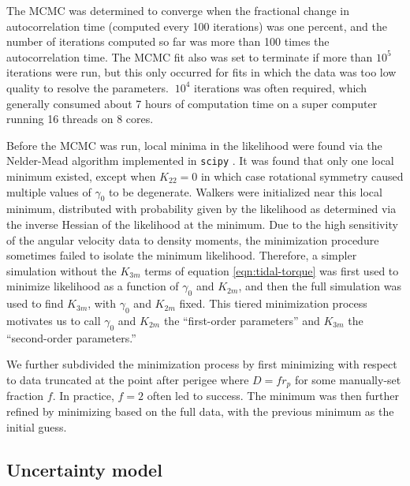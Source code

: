 \documentclass[fleqn,usenatbib]{mnras}
\begin{document}
The MCMC was determined to converge when the fractional change in autocorrelation time (computed every 100 iterations) was one percent, and the number of iterations computed so far was more than 100 times the autocorrelation time. The MCMC fit also was set to terminate if more than $10^5$ iterations were run, but this only occurred for fits in which the data was too low quality to resolve the parameters. $~10^4$ iterations was often required, which generally consumed about 7 hours of computation time on a super computer running 16 threads on 8 cores.

Before the MCMC was run, local minima in the likelihood were found via the Nelder-Mead algorithm implemented in \texttt{scipy} \cite{Gao2012}. It was found that only one local minimum existed, except when $K_{22}=0$ in which case rotational symmetry caused multiple values of $\gamma_0$ to be degenerate. Walkers were initialized near this local minimum, distributed with probability given by the likelihood as determined via the inverse Hessian of the likelihood at the minimum. Due to the high sensitivity of the angular velocity data to density moments, the minimization procedure sometimes failed to isolate the minimum likelihood. Therefore, a simpler simulation without the $K_{3m}$ terms of equation \ref{eqn:tidal-torque} was first used to minimize likelihood as a function of $\gamma_0$ and $K_{2m}$, and then the full simulation was used to find $K_{3m}$, with $\gamma_0$ and $K_{2m}$ fixed. This tiered minimization process motivates us to call $\gamma_0$ and $K_{2m}$ the ``first-order parameters'' and $K_{3m}$ the ``second-order parameters.''

We further subdivided the minimization process by first minimizing with respect to data truncated at the point after perigee where $D=fr_p$ for some manually-set fraction $f$. In practice, $f=2$ often led to success. The minimum was then further refined by minimizing based on the full data, with the previous minimum as the initial guess.




\subsection{Uncertainty model}
\label{sec:uncertainty}
\end{document}
